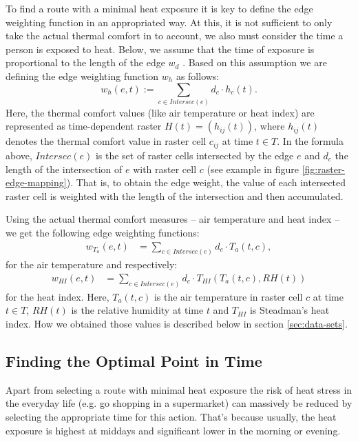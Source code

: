 To find a route with a minimal heat exposure it is key to define the edge weighting function in an appropriated way. At this, it is not sufficient to only take the actual thermal comfort in to account, we also must consider the time a person is exposed to heat. Below, we assume that the time of exposure is proportional to the length of the edge $w_d$ \parencite[following][]{Hasenfratz2015}. Based on this assumption we are defining the edge weighting function $w_h$ as follows: 
\begin{equation}\label{eq:edge-weight}
w_h(e, t) := \sum_{c \in Intersec(e)} d_c \cdot h_c(t).
\end{equation}
Here, the thermal comfort values (like air temperature or heat index) are represented as time-dependent raster $H(t) = \left(h_{ij}(t)\right)$, where $h_{ij}(t)$ denotes the thermal comfort value in raster cell $c_{ij}$ at time $t \in T$. In the formula above, $Intersec(e)$ is the set of raster cells intersected by the edge $e$ and $d_c$ the length of the intersection of $e$ with raster cell $c$ (see example in figure \ref{fig:raster-edge-mapping}). That is, to obtain the edge weight, the value of each intersected raster cell is weighted with the length of the intersection and then accumulated.

Using the actual thermal comfort measures -- air temperature and heat index -- we get the following edge weighting functions:
\begin{align}
	\label{eq:edge-weight-temperature}
	w_{T_a}(e,t)& = \sum_{c \in Intersec(e)} d_c \cdot T_a(t, c),
\end{align}
for the air temperature and respectively:
\begin{align}
	\label{eq:edge-weight-heatindex}
	w_{HI}(e,t)& = \sum_{c \in Intersec(e)} d_c \cdot T_{HI}\left(T_a(t, c), RH(t)\right)
\end{align}
for the heat index. Here, $T_a(t,c)$ is the air temperature in raster cell $c$ at time $t \in T$, $RH(t)$ is the relative humidity at time $t$ and $T_{HI}$ is Steadman's heat index. How we obtained those values is described below in section \ref{sec:data-sets}.

 \subsection{Finding the Optimal Point in Time \label{sec:find-optimal-time}}
 
 Apart from selecting a route with minimal heat exposure the risk of heat stress in the everyday life (e.g. go shopping in a supermarket) can massively be reduced by selecting the appropriate time for this action. That's because usually, the heat exposure is highest at middays and significant lower in the morning or evening.
 
